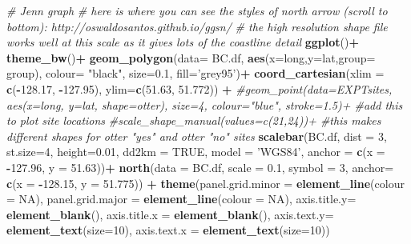 \documentclass[]{book}
\newenvironment{Shaded}{\begin{snugshade}}{\end{snugshade}}
\newcommand{\KeywordTok}[1]{\textcolor[rgb]{0.13,0.29,0.53}{\textbf{#1}}}
\newcommand{\DataTypeTok}[1]{\textcolor[rgb]{0.13,0.29,0.53}{#1}}
\newcommand{\DecValTok}[1]{\textcolor[rgb]{0.00,0.00,0.81}{#1}}
\newcommand{\FloatTok}[1]{\textcolor[rgb]{0.00,0.00,0.81}{#1}}
\newcommand{\StringTok}[1]{\textcolor[rgb]{0.31,0.60,0.02}{#1}}
\newcommand{\CommentTok}[1]{\textcolor[rgb]{0.56,0.35,0.01}{\textit{#1}}}
\newcommand{\OtherTok}[1]{\textcolor[rgb]{0.56,0.35,0.01}{#1}}
\newcommand{\OperatorTok}[1]{\textcolor[rgb]{0.81,0.36,0.00}{\textbf{#1}}}
\newcommand{\NormalTok}[1]{#1}
\begin{document}
\begin{Shaded}
\begin{Highlighting}[]
\CommentTok{# Jenn graph}
\CommentTok{# here is where you can see the styles of north arrow (scroll to bottom): http://oswaldosantos.github.io/ggsn/}
\CommentTok{# the high resolution shape file works well at this scale as it gives lots of the coastline detail}
\KeywordTok{ggplot}\NormalTok{()}\OperatorTok{+}\StringTok{ }\KeywordTok{theme_bw}\NormalTok{()}\OperatorTok{+}
\StringTok{    }\KeywordTok{geom_polygon}\NormalTok{(}\DataTypeTok{data=}\NormalTok{ BC.df, }\KeywordTok{aes}\NormalTok{(}\DataTypeTok{x=}\NormalTok{long,}\DataTypeTok{y=}\NormalTok{lat,}\DataTypeTok{group=}\NormalTok{ group),}
      \DataTypeTok{colour=} \StringTok{"black"}\NormalTok{, }\DataTypeTok{size=}\FloatTok{0.1}\NormalTok{, }\DataTypeTok{fill=}\StringTok{'grey95'}\NormalTok{)}\OperatorTok{+}
\StringTok{  }\KeywordTok{coord_cartesian}\NormalTok{(}\DataTypeTok{xlim =} \KeywordTok{c}\NormalTok{(}\OperatorTok{-}\FloatTok{128.17}\NormalTok{, }\OperatorTok{-}\FloatTok{127.95}\NormalTok{), }\DataTypeTok{ylim=}\KeywordTok{c}\NormalTok{(}\FloatTok{51.63}\NormalTok{, }\FloatTok{51.772}\NormalTok{)) }\OperatorTok{+}
\StringTok{  }\CommentTok{#geom_point(data=EXPTsites, aes(x=long, y=lat, shape=otter), size=4, colour="blue", stroke=1.5)+  #add this to plot site locations}
\StringTok{  }\CommentTok{#scale_shape_manual(values=c(21,24))+         #this makes different shapes for otter "yes" and otter "no" sites}
\StringTok{  }\KeywordTok{scalebar}\NormalTok{(BC.df, }\DataTypeTok{dist =} \DecValTok{3}\NormalTok{, }\DataTypeTok{st.size=}\DecValTok{4}\NormalTok{, }\DataTypeTok{height=}\FloatTok{0.01}\NormalTok{, }\DataTypeTok{dd2km =} \OtherTok{TRUE}\NormalTok{, }\DataTypeTok{model =} \StringTok{'WGS84'}\NormalTok{, }\DataTypeTok{anchor =} \KeywordTok{c}\NormalTok{(}\DataTypeTok{x =} \OperatorTok{-}\FloatTok{127.96}\NormalTok{, }\DataTypeTok{y =} \FloatTok{51.63}\NormalTok{))}\OperatorTok{+}
\StringTok{  }\KeywordTok{north}\NormalTok{(}\DataTypeTok{data =}\NormalTok{ BC.df, }\DataTypeTok{scale =} \FloatTok{0.1}\NormalTok{, }\DataTypeTok{symbol =} \DecValTok{3}\NormalTok{, }\DataTypeTok{anchor=} \KeywordTok{c}\NormalTok{(}\DataTypeTok{x =} \OperatorTok{-}\FloatTok{128.15}\NormalTok{, }\DataTypeTok{y =} \FloatTok{51.775}\NormalTok{)) }\OperatorTok{+}
\StringTok{    }\KeywordTok{theme}\NormalTok{(}\DataTypeTok{panel.grid.minor =} \KeywordTok{element_line}\NormalTok{(}\DataTypeTok{colour =} \OtherTok{NA}\NormalTok{),}
          \DataTypeTok{panel.grid.major =} \KeywordTok{element_line}\NormalTok{(}\DataTypeTok{colour =} \OtherTok{NA}\NormalTok{),}
          \DataTypeTok{axis.title.y=} \KeywordTok{element_blank}\NormalTok{(), }\DataTypeTok{axis.title.x =} \KeywordTok{element_blank}\NormalTok{(),}
          \DataTypeTok{axis.text.y=} \KeywordTok{element_text}\NormalTok{(}\DataTypeTok{size=}\DecValTok{10}\NormalTok{), }\DataTypeTok{axis.text.x =} \KeywordTok{element_text}\NormalTok{(}\DataTypeTok{size=}\DecValTok{10}\NormalTok{))}
\end{Highlighting}
\end{Shaded}
\end{document}
